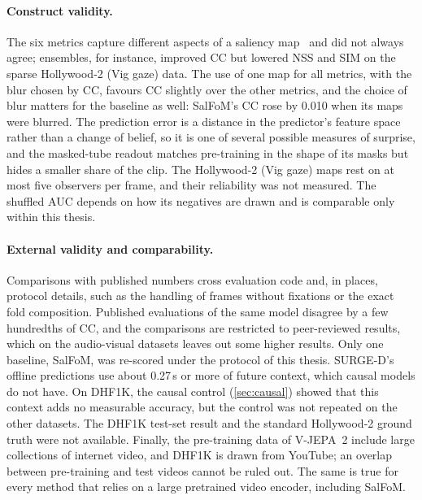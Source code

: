 \paragraph{Construct validity.} The six metrics capture different aspects of a
saliency map~\cite{bylinskii2019metrics} and did not always agree; ensembles,
for instance, improved \acrshort{CC} but lowered \acrshort{NSS} and \acrshort{SIM} on the sparse Hollywood-2
(Vig gaze) data. The use of one map for all metrics, with the blur chosen by \acrshort{CC},
favours \acrshort{CC} slightly over the other metrics, and the choice of blur matters for
the baseline as well: SalFoM's \acrshort{CC} rose by 0.010 when its maps were blurred. The
prediction error is a distance in the predictor's feature space rather than a
change of belief, so it is one of several possible measures of surprise, and
the masked-tube readout matches pre-training in the shape of its masks but
hides a smaller share of the clip. The
Hollywood-2 (Vig gaze) maps rest on at most five observers per frame, and their
reliability was not measured. The shuffled \acrshort{AUC} depends on how its negatives are
drawn and is comparable only within this thesis.

\paragraph{External validity and comparability.} Comparisons with published
numbers cross evaluation code and, in places, protocol details, such as the
handling of frames without fixations or the exact fold composition. Published
evaluations of the same model disagree by a few hundredths of \acrshort{CC}, and the
comparisons are restricted to peer-reviewed results, which on the audio-visual
datasets leaves out some higher results. Only one baseline, SalFoM, was re-scored
under the protocol of this thesis. SURGE-D's offline predictions use about
0.27\,s or more of future context, which causal models do not have. On DHF1K, the
causal control (\cref{sec:causal}) showed that this context adds no measurable
accuracy, but the control was not repeated on the other datasets. The DHF1K
test-set result and the standard Hollywood-2 ground truth were not available.
Finally, the pre-training data of \acrshort{V-JEPA}~2 include large
collections of internet video, and DHF1K is drawn from YouTube; an overlap
between pre-training and test videos cannot be ruled out. The same is true for
every method that relies on a large pretrained video encoder, including SalFoM.
